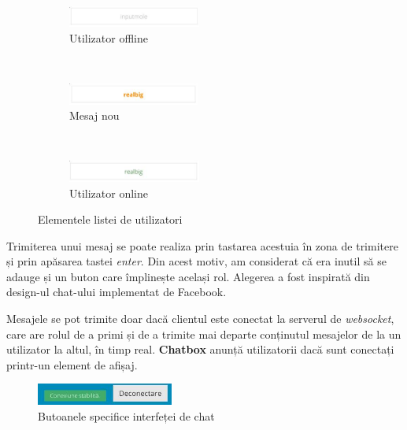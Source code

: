 \documentclass[12pt,a4paper]{article}
\begin{document}
\begin{figure}[h!]
        \centering
        \begin{subfigure}[b]{0.25\textwidth}
                \includegraphics[height=0.7cm]{img/lista_offline.jpg}
                \caption{Utilizator offline}
        \end{subfigure}%
        ~ \qquad 
        \begin{subfigure}[b]{0.25\textwidth}
                \includegraphics[height=0.7cm]{img/lista_mesaj.jpg}
                \caption{Mesaj nou}
        \end{subfigure}%
        ~ \qquad 
        \begin{subfigure}[b]{0.25\textwidth}
                \includegraphics[height=0.7cm]{img/lista_online.jpg}
                \caption{Utilizator online}
        \end{subfigure}
        \vspace{-7px}
        \caption{Elementele listei de utilizatori}%
\end{figure}


Trimiterea unui mesaj se poate realiza prin tastarea acestuia în zona de trimitere și prin 
apăsarea tastei \textit{enter}. Din acest motiv, am considerat că era inutil să se 
adauge și un buton care împlinește același rol. Alegerea a fost inspirată din design-ul 
chat-ului implementat de Facebook. 

Mesajele se pot trimite doar dacă clientul este conectat la serverul de \textit{websocket}, 
care are rolul de a primi și de a trimite mai departe conținutul mesajelor de la un 
utilizator la altul, în timp real. \textbf{Chatbox} anunță utilizatorii dacă sunt conectați 
printr-un element de afișaj.

\begin{figure}[!h]
	\centering
	\vspace{-7px}
	\includegraphics[width=0.4\textwidth]{img/chat_butoane.jpg}
	\vspace{-7px}
	\caption{Butoanele specifice interfeței de chat}
\end{figure}
\end{document}
